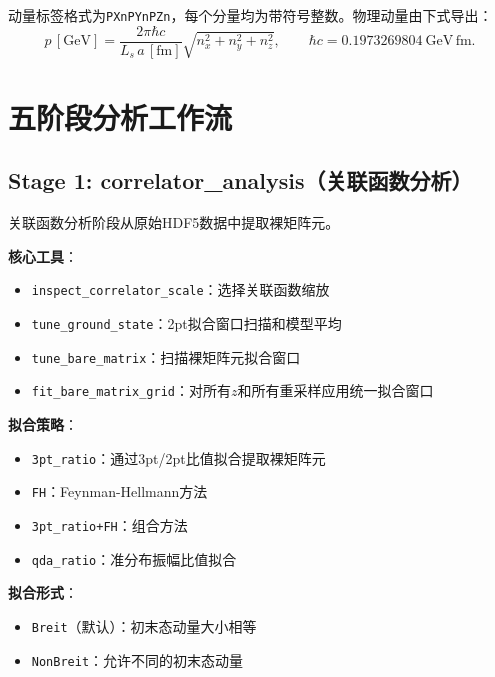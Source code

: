 \documentclass[12pt,a4paper]{ctexart}
\begin{document}
动量标签格式为\texttt{PXnPYnPZn}，每个分量均为带符号整数。物理动量由下式导出：
\begin{equation}
p\,[\mathrm{GeV}] = \frac{2\pi\hbar c}{L_s\,a\,[\mathrm{fm}]} \sqrt{n_x^2+n_y^2+n_z^2}, \qquad \hbar c = 0.1973269804\ \mathrm{GeV\,fm}.
\end{equation}

\section{五阶段分析工作流}

\subsection{Stage 1: correlator\_analysis（关联函数分析）}

关联函数分析阶段从原始HDF5数据中提取裸矩阵元。

\textbf{核心工具}：
\begin{itemize}[leftmargin=*]
    \item \texttt{inspect\_correlator\_scale}：选择关联函数缩放
    \item \texttt{tune\_ground\_state}：2pt拟合窗口扫描和模型平均
    \item \texttt{tune\_bare\_matrix}：扫描裸矩阵元拟合窗口
    \item \texttt{fit\_bare\_matrix\_grid}：对所有$z$和所有重采样应用统一拟合窗口
\end{itemize}

\textbf{拟合策略}：
\begin{itemize}[leftmargin=*]
    \item \texttt{3pt\_ratio}：通过3pt/2pt比值拟合提取裸矩阵元
    \item \texttt{FH}：Feynman-Hellmann方法
    \item \texttt{3pt\_ratio+FH}：组合方法
    \item \texttt{qda\_ratio}：准分布振幅比值拟合
\end{itemize}

\textbf{拟合形式}：
\begin{itemize}[leftmargin=*]
    \item \texttt{Breit}（默认）：初末态动量大小相等
    \item \texttt{NonBreit}：允许不同的初末态动量
\end{itemize}
\end{document}
